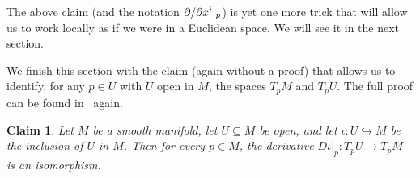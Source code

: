 \documentclass[11pt,a4paper,twoside,openany]{report}
\theoremstyle{my-theorem}
\newtheorem{claim}[theorem]{Claim}
\theoremstyle{non-theorem}
\begin{document}
		The above claim (and the notation $\partial/\partial x^i|_p$) is yet one more trick that will allow us to work locally as if we were in a Euclidean space. We will see it in the next section.
		
		We finish this section with the claim (again without a proof) that allows us to identify, for any $p \in U$ with $U$ open in $M$, the spaces $T_pM$ and $T_pU$. The full proof can be found in~\cite{lee:manifolds-and-differential-geometry} again.
		\begin{claim}
			\label{claim:differential-of-an-inclusion}
			Let $M$ be a smooth manifold, let $U \subseteq M$ be open, and let $\iota: U \hookrightarrow M$ be the inclusion of $U$ in $M$. Then for every $p \in M$, the derivative $D\iota|_p: T_pU \to T_p M$ is an isomorphism.
		\end{claim}
		
\end{document}
